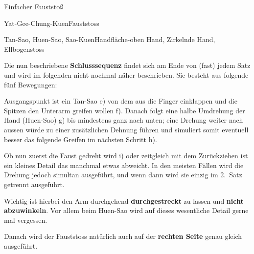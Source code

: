 \begin{WTSatz}{Einfacher Fauststo{\ss}}
\begin{WTSatzTeil}{Yat-Gee-Chung-Kuen}{Fauststoss}
	\end{WTSatzTeil}
	\begin{WTSatzTeil}{Tan-Sao, Huen-Sao, Sao-Kuen}{Handfl\"ache-oben Hand, Zirkelnde Hand, Ellbogenstoss}
	
		Die nun beschriebene \textbf{Schlusssequenz} findet sich am Ende von (fast) jedem Satz und wird im folgenden nicht nochmal n\"aher beschrieben. Sie besteht aus folgende f\"unf Bewegungen:
		
		
		Ausgangspunkt ist ein Tan-Sao e) von dem aus die Finger einklappen und die Spitzen den Unterarm greifen wollen f). Danach folgt eine halbe Umdrehung der Hand (Huen-Sao) g) bis mindestens ganz nach unten; eine Drehung weiter nach aussen w\"urde zu einer zus\"atzlichen Dehnung f\"uhren und simuliert somit eventuell besser das folgende Greifen im n\"achsten Schritt h).
		
		
		Ob nun zuerst die Faust gedreht wird i) oder zeitgleich mit dem Zur\"uckziehen ist ein kleines Detail das manchmal etwas abweicht. In den meisten F\"allen wird die Drehung jedoch simultan ausgef\"uhrt, und wenn dann wird sie einzig im 2.~Satz getrennt ausgef\"uhrt.
		
	\begin{WTCommonNoob}
		Wichtig ist hierbei den Arm durchgehend \textbf{durchgestreckt} zu lassen und \textbf{nicht abzuwinkeln}. Vor allem beim Huen-Sao wird auf dieses wesentliche Detail gerne mal vergessen.
	\end{WTCommonNoob}
	
	Danach wird der Fauststoss nat\"urlich auch auf der \textbf{rechten Seite} genau gleich ausgef\"uhrt.
		
	\end{WTSatzTeil}
\end{WTSatz}


